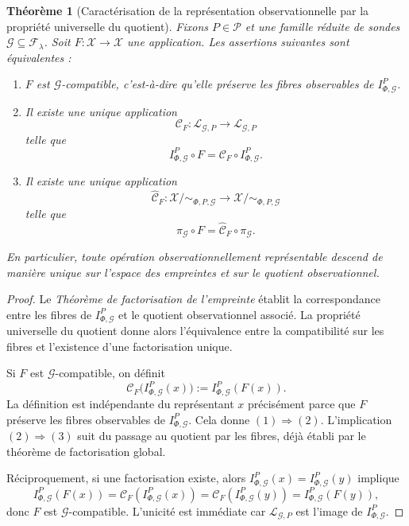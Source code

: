 \documentclass[11pt,a4paper,openany]{book}
\newtheorem{theorem}[definition]{Théorème}
\begin{document}
\begin{theorem}[Caractérisation de la représentation observationnelle par la propriété universelle du quotient]
\label{thm:representation-observationnelle}
Fixons \(P\in\mathcal P\) et une famille réduite de sondes \(\mathcal G\subseteq\mathcal F_\lambda\). Soit \(F:\mathcal X\to\mathcal X\) une application. Les assertions suivantes sont équivalentes :
\begin{enumerate}[label=\textbf{(\arabic*)}]
\item \(F\) est \(\mathcal G\)-compatible, c'est-à-dire qu'elle préserve les fibres observables de \(I_{\Phi,\mathcal G}^P\).
\item Il existe une unique application
\[
\mathcal C_F:\mathcal L_{\mathcal G,P}\longrightarrow \mathcal L_{\mathcal G,P}
\]
telle que
\[
I_{\Phi,\mathcal G}^P\circ F=\mathcal C_F\circ I_{\Phi,\mathcal G}^P.
\]
\item Il existe une unique application
\[
\widehat{\mathcal C}_F:\mathcal X/{\sim_{\Phi,P,\mathcal G}}\longrightarrow \mathcal X/{\sim_{\Phi,P,\mathcal G}}
\]
telle que
\[
\pi_{\mathcal G}\circ F=\widehat{\mathcal C}_F\circ \pi_{\mathcal G}.
\]
\end{enumerate}

En particulier, toute opération observationnellement représentable descend de manière unique sur l'espace des empreintes et sur le quotient observationnel.
\end{theorem}

\begin{proof}
Le \emph{Théorème de factorisation de l'empreinte} établit la correspondance entre les fibres de \(I_{\Phi,\mathcal G}^P\) et le quotient observationnel associé. La propriété universelle du quotient donne alors l'équivalence entre la compatibilité sur les fibres et l'existence d'une factorisation unique.

Si \(F\) est \(\mathcal G\)-compatible, on définit
\[
\mathcal C_F\bigl(I_{\Phi,\mathcal G}^P(x)\bigr):=I_{\Phi,\mathcal G}^P(F(x)).
\]
La définition est indépendante du représentant \(x\) précisément parce que \(F\) préserve les fibres observables de \(I_{\Phi,\mathcal G}^P\). Cela donne \((1)\Rightarrow(2)\). L'implication \((2)\Rightarrow(3)\) suit du passage au quotient par les fibres, déjà établi par le théorème de factorisation global.

Réciproquement, si une factorisation existe, alors \(I_{\Phi,\mathcal G}^P(x)=I_{\Phi,\mathcal G}^P(y)\) implique
\[
I_{\Phi,\mathcal G}^P(F(x))
=
\mathcal C_F(I_{\Phi,\mathcal G}^P(x))
=
\mathcal C_F(I_{\Phi,\mathcal G}^P(y))
=
I_{\Phi,\mathcal G}^P(F(y)),
\]
donc \(F\) est \(\mathcal G\)-compatible. L'unicité est immédiate car \(\mathcal L_{\mathcal G,P}\) est l'image de \(I_{\Phi,\mathcal G}^P\).
\end{proof}
\end{document}
